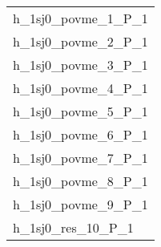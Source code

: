 \begin{tabular}{l}
\hline
 h\_1sj0\_povme\_1\_P\_1 \\
 h\_1sj0\_povme\_2\_P\_1 \\
 h\_1sj0\_povme\_3\_P\_1 \\
 h\_1sj0\_povme\_4\_P\_1 \\
 h\_1sj0\_povme\_5\_P\_1 \\
 h\_1sj0\_povme\_6\_P\_1 \\
 h\_1sj0\_povme\_7\_P\_1 \\
 h\_1sj0\_povme\_8\_P\_1 \\
 h\_1sj0\_povme\_9\_P\_1 \\
 h\_1sj0\_res\_10\_P\_1  \\
\hline
\end{tabular}